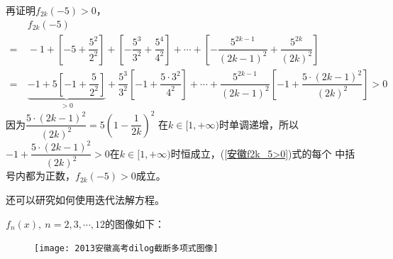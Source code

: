 \begin{enumerate}[label={【\textbf{例\thechapter.\arabic*}】},
 leftmargin=\inteval{\myenumleftmargin}pt,
 itemsep=\inteval{\myenumitempsep}pt,
 itemindent=\inteval{\myenumitemindent}pt]
再证明$ f_{2k}(-5)>0 $，
\begin{align}
     &\ f_{2k}(-5) \nonumber \\
    =&\ -1+\left[-5+\dfrac{5^2}{2^2}\right]+\left[-\dfrac{5^3}{3^2}
    +\dfrac{5^4}{4^2}\right] +\cdots+\left[-\dfrac{5^{2k-1}}{(2k-1)^2}
    +\dfrac{5^{2k}}{(2k)^2}\right] \nonumber \\
    =&\ \underbrace{-1+5\left[-1+\dfrac{5}{2^2}\right]}_{>0}
    +\dfrac{5^3}{3^2}\left[
    -1+\dfrac{5\cdot 3^2}{4^2}\right]+\cdots+\dfrac{5^{2k-1}}
    {(2k-1)^2}\left[-1+\dfrac{5\cdot (2k-1)^2}{(2k)^2}\right]>0
    \label{安徽f2k_5>0}
\end{align}
因为$ \dfrac{5\cdot (2k-1)^2}{(2k)^2}=5\left(1-\dfrac{1}{2k}\right)^2 $
在$ k\in[1,+\infty) $时单调递增，所以$ -1+\dfrac{5\cdot (2k-1)^2}
{(2k)^2}>0 $在$ k\in[1,+\infty) $时恒成立，(\ref{安徽f2k_5>0})式的每个
中括号内都为正数，$ f_{2k}(-5)>0 $成立。

还可以研究如何使用迭代法解方程。

$f_n(x),\ n=2,3,\cdots, 12 $的图像如下：
\begin{figure}[h]
    \centering
    \texttt{[image: 2013安徽高考dilog截断多项式图像]}
\end{figure}


\end{enumerate}
